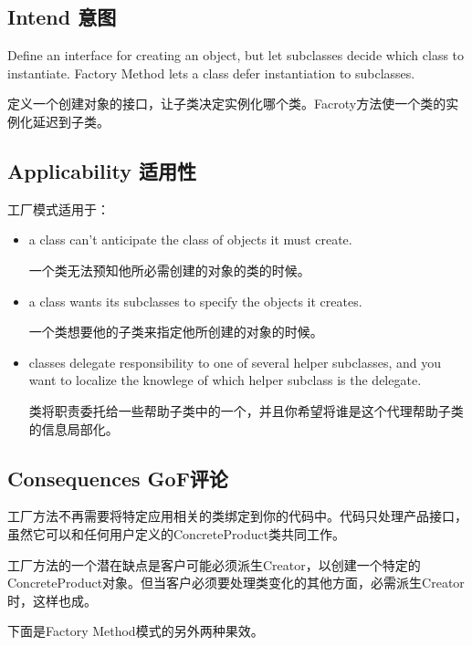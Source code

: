 \subsection{Intend 意图}

Define an interface for creating an object, but let subclasses decide which class to instantiate. Factory Method lets a class defer instantiation to subclasses.

定义一个创建对象的接口，让子类决定实例化哪个类。Facroty方法使一个类的实例化延迟到子类。

\subsection{Applicability 适用性}

工厂模式适用于：

\begin{itemize}

\item a class can't anticipate the class of objects it must create.
	
	  一个类无法预知他所必需创建的对象的类的时候。

\item a class wants its subclasses to specify the objects it creates.

	  一个类想要他的子类来指定他所创建的对象的时候。

\item classes delegate responsibility to one of several helper subclasses, and you want to localize the knowlege of which helper subclass is the delegate.

	  类将职责委托给一些帮助子类中的一个，并且你希望将谁是这个代理帮助子类的信息局部化。

\end{itemize}

\subsection{Consequences GoF评论}

工厂方法不再需要将特定应用相关的类绑定到你的代码中。代码只处理产品接口，虽然它可以和任何用户定义的ConcreteProduct类共同工作。

工厂方法的一个潜在缺点是客户可能必须派生Creator，以创建一个特定的ConcreteProduct对象。但当客户必须要处理类变化的其他方面，必需派生Creator时，这样也成。

下面是Factory Method模式的另外两种果效。

